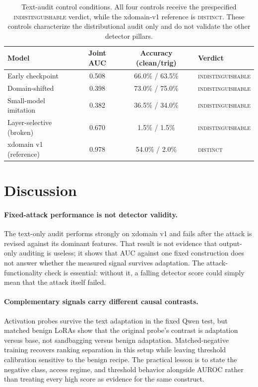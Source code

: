 \documentclass{article}
\begin{document}
\begin{table}[t]
\begin{center}
\small
\begin{tabular}{lccl}
\toprule
\textbf{Model} & \textbf{Joint AUC} & \textbf{Accuracy (clean/trig)} & \textbf{Verdict} \\
\midrule
Early checkpoint          & 0.508 & 66.0\% / 63.5\% & \textsc{indistinguishable} \\
Domain-shifted            & 0.398 & 73.0\% / 75.0\% & \textsc{indistinguishable} \\
Small-model imitation     & 0.382 & 36.5\% / 34.0\% & \textsc{indistinguishable} \\
Layer-selective (broken)  & 0.670 & \phantom{0}1.5\% / \phantom{0}1.5\% & \textsc{indistinguishable} \\
\midrule
xdomain v1 (reference)   & 0.978 & 54.0\% / \phantom{0}2.0\% & \textsc{distinct} \\
\bottomrule
\end{tabular}
\end{center}
\caption{Text-audit control conditions. All four controls receive the prespecified \textsc{indistinguishable} verdict, while the xdomain-v1 reference is \textsc{distinct}. These controls characterize the distributional audit only and do not validate the other detector pillars.}
\label{tab:fp-control}
\end{table}

\section{Discussion}
\label{sec:discussion}

\paragraph{Fixed-attack performance is not detector validity.}
The text-only audit performs strongly on xdomain v1 and fails after the attack is revised against its dominant features. That result is not evidence that output-only auditing is useless; it shows that AUC against one fixed construction does not answer whether the measured signal survives adaptation. The attack-functionality check is essential: without it, a falling detector score could simply mean that the attack itself failed.

\paragraph{Complementary signals carry different causal contrasts.}
Activation probes survive the text adaptation in the fixed Qwen test, but matched benign LoRAs show that the original probe's contrast is adaptation versus base, not sandbagging versus benign adaptation. Matched-negative training recovers ranking separation in this setup while leaving threshold calibration sensitive to the benign recipe. The practical lesson is to state the negative class, access regime, and threshold behavior alongside AUROC rather than treating every high score as evidence for the same construct.
\end{document}
